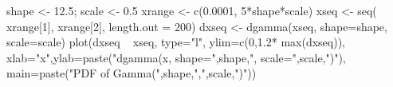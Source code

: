 \begin{Schunk}
\begin{Sinput}
  shape <- 12.5; scale <- 0.5
  xrange <- c(0.0001, 5*shape*scale)
  xseq <- seq( xrange[1], xrange[2], length.out = 200)
  dxseq <- dgamma(xseq, shape=shape, scale=scale)
  plot(dxseq ~ xseq, type="l", ylim=c(0,1.2* max(dxseq)), xlab="x",ylab=paste("dgamma(x, shape=",shape,", scale=",scale,")"), main=paste("PDF of Gamma(",shape,",",scale,")"))
\end{Sinput}
\end{Schunk}
